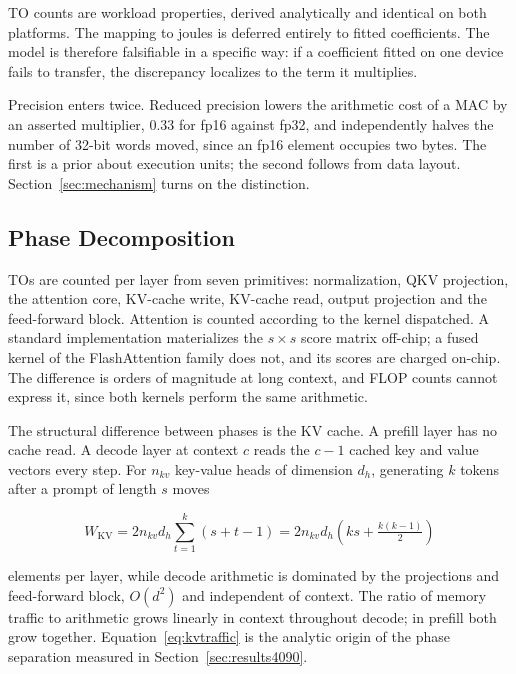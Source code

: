 \documentclass[conference]{IEEEtran}
\begin{document}
TO counts are workload properties, derived analytically and identical on
both platforms. The mapping to joules is deferred entirely to fitted
coefficients. The model is therefore falsifiable in a specific way: if a
coefficient fitted on one device fails to transfer, the discrepancy
localizes to the term it multiplies.

Precision enters twice. Reduced precision lowers the arithmetic cost of a
MAC by an asserted multiplier, 0.33 for fp16 against fp32, and
independently halves the number of 32-bit words moved, since an fp16
element occupies two bytes. The first is a prior about execution units; the
second follows from data layout. Section~\ref{sec:mechanism} turns on the
distinction.

\subsection{Phase Decomposition}

TOs are counted per layer from seven primitives: normalization, QKV
projection, the attention core, KV-cache write, KV-cache read, output
projection and the feed-forward block. Attention is counted according to the
kernel dispatched. A standard implementation materializes the $s \times s$
score matrix off-chip; a fused kernel of the FlashAttention family
\cite{flashattention} does not, and its scores are charged on-chip. The
difference is orders of magnitude at long context, and FLOP counts cannot
express it, since both kernels perform the same arithmetic.

The structural difference between phases is the KV cache. A prefill layer
has no cache read. A decode layer at context $c$ reads the $c-1$ cached key
and value vectors every step. For $n_{kv}$ key-value heads of dimension
$d_h$, generating $k$ tokens after a prompt of length $s$ moves

\begin{equation}
W_{\mathrm{KV}} = 2 n_{kv} d_h \sum_{t=1}^{k} (s + t - 1)
= 2 n_{kv} d_h \left( ks + \tfrac{k(k-1)}{2} \right)
\label{eq:kvtraffic}
\end{equation}

elements per layer, while decode arithmetic is dominated by the projections
and feed-forward block, $O(d^2)$ and independent of context. The ratio of
memory traffic to arithmetic grows linearly in context throughout decode; in
prefill both grow together. Equation~\ref{eq:kvtraffic} is the analytic
origin of the phase separation measured in Section~\ref{sec:results4090}.
\end{document}
